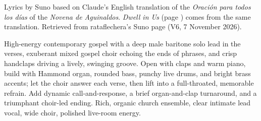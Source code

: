 
\label{sec:make-our-hearts-a-cradle}
\begin{notes}
Lyrics by Suno based on Claude's English translation of the \emph{Oración para todos los días} of the \emph{Novena de Aguinaldos}. \emph{Dwell in Us} (page \pageref{sec:dwell-in-us}) comes from the same translation. Retrieved from rataflechera's Suno page (V6, 7 November 2026).
\end{notes}
\begin{style}
High-energy contemporary gospel with a deep male baritone solo lead in the verses, exuberant mixed gospel choir echoing the ends of phrases, and crisp handclaps driving a lively, swinging groove. Open with claps and warm piano, build with Hammond organ, rounded bass, punchy live drums, and bright brass accents; let the choir answer each verse, then lift into a full-throated, memorable refrain. Add dynamic call-and-response, a brief organ-and-clap turnaround, and a triumphant choir-led ending. Rich, organic church ensemble, clear intimate lead vocal, wide choir, polished live-room energy.
\end{style}
